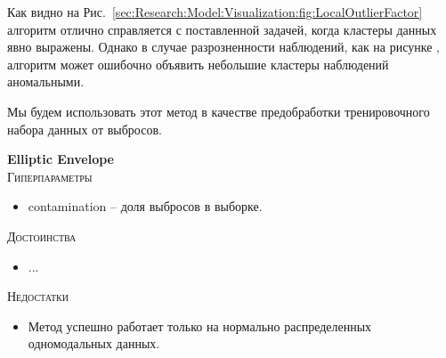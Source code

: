 \documentclass[12pt]{article}
\begin{document}
    \par Как видно на Рис.~\ref{sec:Research:Model:Visualization:fig:LocalOutlierFactor} алгоритм отлично справляется с поставленной задачей, когда кластеры данных явно выражены. Однако в случае разрозненности наблюдений, как на рисунке , алгоритм может ошибочно объявить небольшие кластеры наблюдений аномальными.

    \par Мы будем использовать этот метод в качестве предобработки тренировочного набора данных от выбросов.

    \newpage


    \textbf{Elliptic Envelope} \\

    \noindent \textsc{Гиперпараметры}
    \begin{itemize}
        \item contamination – доля выбросов в выборке.
    \end{itemize}

    \noindent \textsc{Достоинства}
    \begin{itemize}
        \item ...
    \end{itemize}

    \noindent \textsc{Недостатки}
    \begin{itemize}
        \item Метод успешно работает только на нормально распределенных одномодальных данных.
    \end{itemize}
\end{document}
